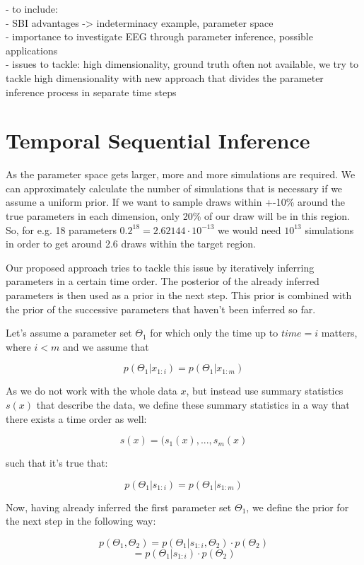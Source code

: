 \documentclass[12pt]{report}
\begin{document}
- to include: \\
- SBI advantages -> indeterminacy example, parameter space\\
- importance to investigate EEG through parameter inference, possible applications\\
- issues to tackle: high dimensionality, ground truth often not available, we try to tackle high dimensionality with new approach that divides the parameter inference process in separate time steps




\section{Temporal Sequential Inference}

As the parameter space gets larger, more and more simulations are required. We can approximately calculate the number of simulations that is necessary if we assume a uniform prior. If we want to sample draws within +-10\% around the true parameters in each dimension, only 20\% of our draw will be in this region. 
So, for e.g. 18 parameters $0.2^{18}=2.62144 \cdot 10^{-13}$ we would need $10^{13}$ simulations in order to get around 2.6 draws within the target region.

Our proposed approach tries to tackle this issue by iteratively inferring parameters in a certain time order. The posterior of the already inferred parameters is then used as a prior in the next step. This prior is combined with the prior of the successive parameters that haven't been inferred so far. 

Let's assume a parameter set $\Theta_1$ for which only the time up to $time=i$ matters, where $i<m$ and we assume that

$$ p(\Theta_1|x_{1:i} ) = p(\Theta_1|x_{1:m}  ) $$

As we do not work with the whole data $x$, but instead use summary statistics $s(x)$ that describe the data, we define these summary statistics in a way that there exists a time order as well:

$$s(x) = (s_1(x), ..., s_m(x)    $$

such that it's true that:

$$ p(\Theta_1|s_{1:i} ) = p(\Theta_1|s_{1:m}  ) $$

Now, having already inferred the first parameter set $\Theta_1$, we define the prior for the next step in the following way:

$$ p(\Theta_1, \Theta_2) = p(\Theta_1|s_{1:i} , \Theta_2) \cdot p(\Theta_2)$$
$$ = p(\Theta_1|s_{1:i} ) \cdot p(\Theta_2) $$
\end{document}
